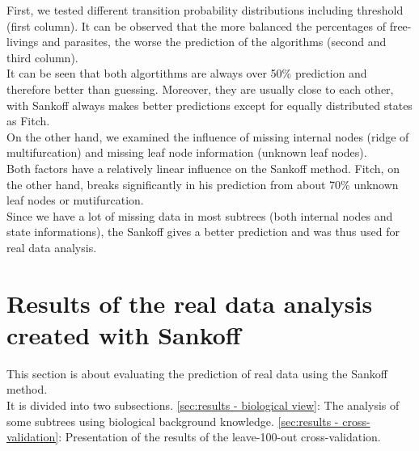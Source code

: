     First, we tested different transition probability distributions including threshold (first column). 
      It can be observed that the more balanced the percentages of free-livings and parasites, the 
      worse the prediction of the algorithms (second and third column). \\
    It can be seen that both algortithms are always over 50\% prediction and therefore better than 
      guessing. Moreover, they are usually close to each other, with Sankoff always makes better 
      predictions except for equally distributed states as Fitch. \\
    On the other hand, we examined the influence of missing internal nodes (ridge of multifurcation) 
      and missing leaf node information (unknown leaf nodes). \\
    Both factors have a relatively linear influence on the Sankoff method. Fitch, on the other hand, 
      breaks significantly in his prediction from about 70\% unknown leaf nodes or mutifurcation. \\

    Since we have a lot of missing data in most subtrees (both internal nodes and state informations), 
      the Sankoff gives a better prediction and was thus used for real data analysis.

  \section{Results of the real data analysis created with Sankoff}
    This section is about evaluating the prediction of real data using the Sankoff method. \\
    It is divided into two subsections. \ref{sec:results - biological view}: The analysis of some subtrees using 
      biological background knowledge. \ref{sec:results - cross-validation}: Presentation of the results 
      of the leave-100-out cross-validation.

